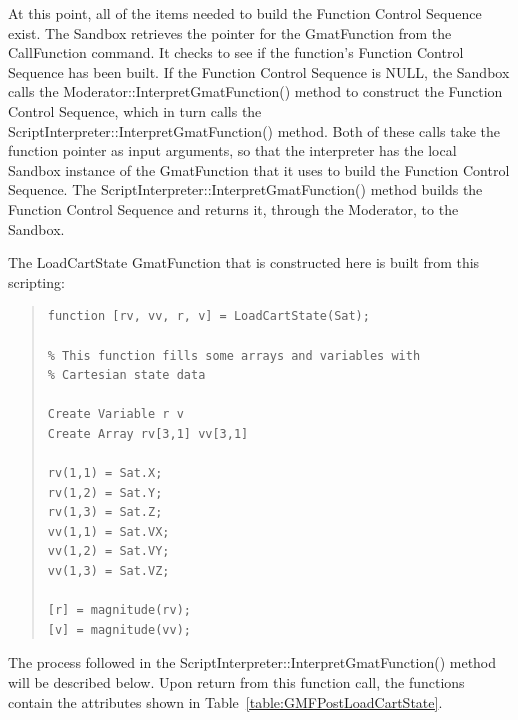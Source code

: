 At this point, all of the items needed to build the Function Control Sequence exist.  The Sandbox
retrieves the pointer for the GmatFunction from the CallFunction command.  It checks to see if the
function's Function Control Sequence has been built.  If the Function Control Sequence is NULL, the
Sandbox calls the Moderator::InterpretGmatFunction() method to construct the Function Control
Sequence, which in turn calls the ScriptInterpreter::InterpretGmatFunction() method.  Both of these
calls take the function pointer as input arguments, so that the interpreter has the local Sandbox
instance of the GmatFunction that it uses to build the Function Control Sequence.  The
ScriptInterpreter::InterpretGmatFunction() method builds the Function Control Sequence and returns
it, through the Moderator, to the Sandbox.

The LoadCartState GmatFunction that is constructed here is built from this scripting:

\begin{quote}
\begin{verbatim}
function [rv, vv, r, v] = LoadCartState(Sat);

% This function fills some arrays and variables with
% Cartesian state data

Create Variable r v
Create Array rv[3,1] vv[3,1]

rv(1,1) = Sat.X;
rv(1,2) = Sat.Y;
rv(1,3) = Sat.Z;
vv(1,1) = Sat.VX;
vv(1,2) = Sat.VY;
vv(1,3) = Sat.VZ;

[r] = magnitude(rv);
[v] = magnitude(vv);
\end{verbatim}
\end{quote}

The process followed in the ScriptInterpreter::InterpretGmatFunction() method will be described
below.  Upon return from this function call, the functions contain the attributes shown in
Table~\ref{table:GMFPostLoadCartState}.

\pagebreak 

